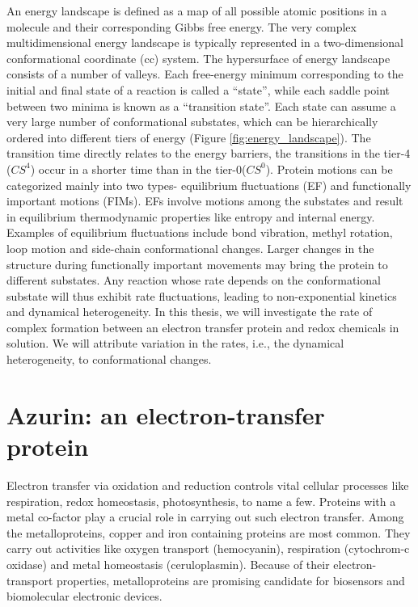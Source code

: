 An energy landscape is defined as a map of all possible atomic positions in a molecule and their corresponding Gibbs free energy.
The very complex multidimensional energy landscape is typically represented in a two-dimensional conformational coordinate (cc) system.
The hypersurface of energy landscape consists of a number of valleys. Each free-energy minimum corresponding to the initial and final state of a reaction is called a ``state'', while each saddle point between two minima is known as a ``transition state''.
Each state can assume a very large number of conformational substates, which can be hierarchically ordered into different tiers of energy (Figure \ref{fig:energy_landscape}).
The transition time directly relates to the energy barriers, the transitions in the tier-4 ($CS^4$) occur in a shorter time than in the tier-0($CS^0$).
Protein motions can be categorized mainly into two types- equilibrium fluctuations (EF) and  functionally important motions (FIMs).\cite{ansari1985protein}
EFs involve motions among the substates and result in equilibrium thermodynamic properties like entropy and internal energy. 
Examples of equilibrium fluctuations include bond vibration, methyl rotation, loop motion and side-chain conformational changes.
Larger changes in the structure during functionally important movements may bring the protein to different substates.
Any reaction whose rate depends on the conformational substate will thus exhibit rate fluctuations, leading to non-exponential kinetics and dynamical heterogeneity.
In this thesis, we will investigate the rate of complex formation between an electron transfer protein and redox chemicals in solution.
We will attribute variation in the rates, i.e., the dynamical heterogeneity, to conformational changes.

\section{Azurin: an electron-transfer protein}
Electron transfer via oxidation and reduction controls vital cellular processes like respiration, redox homeostasis, photosynthesis, to name a few.
Proteins with a metal co-factor play a crucial role in carrying out such electron transfer.
Among the metalloproteins, copper and iron containing proteins are most common.
They carry out activities like oxygen transport (hemocyanin), respiration (cytochrom-c oxidase) and metal homeostasis (ceruloplasmin).
Because of their electron-transport properties, metalloproteins are promising candidate for biosensors and biomolecular electronic devices.

